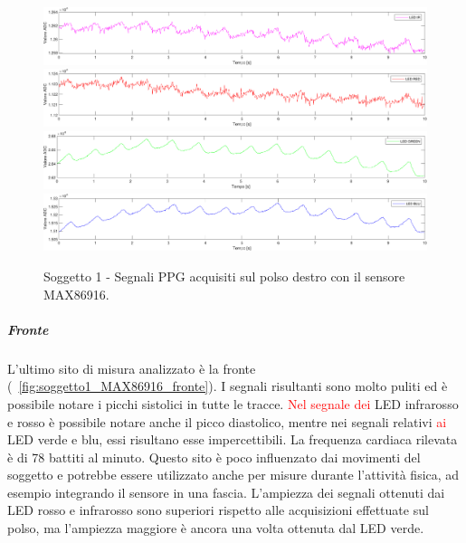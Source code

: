 \begin{figure}[h]
	\centering
	\includegraphics[width=1\linewidth]{ImageFiles/Misure Preliminari/Soggetto 1/MAX86916/polso_ired}
	\includegraphics[width=1\linewidth]{ImageFiles/Misure Preliminari/Soggetto 1/MAX86916/polso_red}
	\includegraphics[width=1\linewidth]{ImageFiles/Misure Preliminari/Soggetto 1/MAX86916/polso_green}
	\includegraphics[width=1\linewidth]{ImageFiles/Misure Preliminari/Soggetto 1/MAX86916/polso_blu}
	\caption{Soggetto 1 - Segnali PPG acquisiti sul polso destro con il sensore MAX86916.}
	\label{fig:soggetto1_MAX86916_polso}
\end{figure}

\clearpage

\subparagraph{Fronte}

L'ultimo sito di misura analizzato è la fronte (\Fig~\ref{fig:soggetto1_MAX86916_fronte}). I segnali risultanti sono molto puliti ed è possibile notare i picchi sistolici in tutte le tracce. \textcolor{red}{Nel segnale dei} LED infrarosso e rosso è possibile notare anche il picco diastolico, mentre nei segnali relativi \textcolor{red}{ai} LED verde e blu, essi risultano esse impercettibili. La frequenza cardiaca rilevata è di 78 battiti al minuto. Questo sito è poco influenzato dai movimenti del soggetto e potrebbe essere utilizzato anche per misure durante l'attività fisica, ad esempio integrando il sensore in una fascia. L'ampiezza dei segnali ottenuti dai LED rosso e infrarosso sono superiori rispetto alle acquisizioni effettuate sul polso, ma l'ampiezza maggiore è ancora una volta ottenuta dal LED verde.

